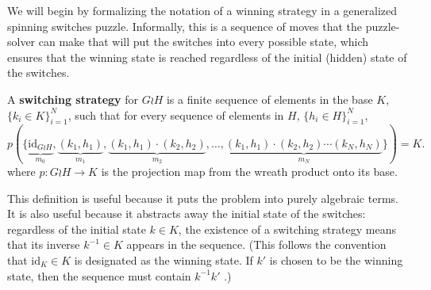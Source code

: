 We will begin by formalizing the notation of a winning strategy in a
generalized spinning switches puzzle. Informally, this is
a sequence of moves that the puzzle-solver can make that will put the switches
into every possible state, which ensures that the winning state is reached
regardless of the initial (hidden) state of the switches.

\begin{definition}
  A \textbf{switching strategy} for $G \wr H$ is a finite sequence of elements
  in the base $K$,
  $\{k_i \in K\}_{i=1}^N$,
  such that for every sequence of elements in $H$, ${\{h_i \in H\}_{i=1}^N}$,
  \begin{equation}
    p(\{
      \underbrace{\mathrm{id}_{G \wr H}}_{m_0},
      \underbrace{(k_1, h_1)}_{m_1},
      \underbrace{(k_1, h_1)\cdot(k_2, h_2)}_{m_2},
      \dots,
      \underbrace{(k_1, h_1)\cdot(k_2, h_2)\cdots(k_N, h_N)}_{m_N}
    \}) = K.
  \end{equation}
  where $p \colon G \wr H \rightarrow K$ is the projection map from the
  wreath product onto its base.
\label{def:switchingStrategy}
\end{definition}

This definition is useful because it puts the problem into purely algebraic
terms. It is also useful because it abstracts away the initial state of the
switches: regardless of the initial state $k \in K$, the existence of a
switching strategy means that its inverse $k^{-1} \in K$ appears in the sequence.
(This follows the convention that $\mathrm{id}_K \in K$ is designated as the
winning state. If $k'$ is chosen to be the winning state, then the sequence
must contain $k^{-1}k'$ .)

